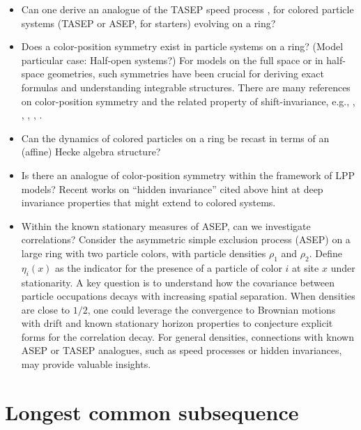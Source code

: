 \documentclass{article}
\theoremstyle{definition}
\begin{document}
\begin{itemize}
	\item Can one derive an analogue of the TASEP speed process \cite{amir2011tasep},
		\cite{aggarwal2023asep} for colored particle systems (TASEP or ASEP, for starters) evolving on a ring?

\item
	Does a color-position symmetry exist in particle systems on a ring? (Model particular case: Half-open systems?)
	For models on the full space or in half-space geometries, such symmetries have been crucial for deriving exact formulas and understanding integrable structures. There are many references
	on color-position symmetry and the related property of shift-invariance, e.g.,
	\cite{BorodinBufetov2021ColorPosition}, \cite{bufetov2020interacting},
	\cite{galashin2020symmetries},
	\cite{corwin2020invariance},
	\cite{dauvergne2020hidden}.

\item
	Can the dynamics of colored particles on a ring be recast in terms of an (affine) Hecke algebra structure?

\item
	Is there an analogue of color-position symmetry within the framework of LPP models?
	Recent works on ``hidden invariance'' cited above hint at deep invariance properties that might extend to colored systems.


\item
	Within the known stationary measures of ASEP, can we investigate correlations?
	Consider the asymmetric simple exclusion process (ASEP) on a
	large ring with two particle colors, with particle densities
	$\rho_1$ and $\rho_2$. Define $\eta_i(x)$ as the indicator
	for the presence of a particle of color $i$ at site $x$
	under stationarity. A key question is to understand how the
	covariance between particle occupations decays with
	increasing spatial separation. When densities are close to
	$1/2$, one could leverage the convergence to Brownian
	motions with drift and known stationary horizon properties
	to conjecture explicit forms for the correlation decay. For
	general densities, connections with known ASEP or TASEP
	analogues, such as speed processes or hidden invariances,
	may provide valuable insights.
\end{itemize}


\section{Longest common subsequence}
\end{document}
